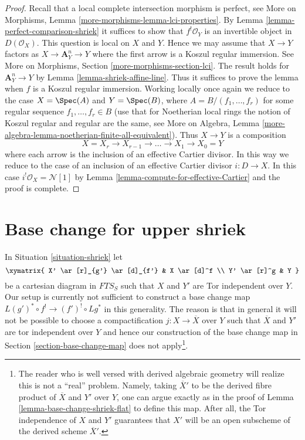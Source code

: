 \begin{proof}
Recall that a local complete intersection morphism is perfect, see
More on Morphisms, Lemma \ref{more-morphisms-lemma-lci-properties}.
By Lemma \ref{lemma-perfect-comparison-shriek} it suffices to show
that $f^!\mathcal{O}_Y$ is an invertible object in $D(\mathcal{O}_X)$.
This question is local on $X$ and $Y$. Hence we may assume that $X \to Y$
factors as $X \to \mathbf{A}^n_Y \to Y$ where the first arrow is a
Koszul regular immersion. See More on Morphisms, Section
\ref{more-morphisms-section-lci}.
The result holds for $\mathbf{A}^n_Y \to Y$
by Lemma \ref{lemma-shriek-affine-line}. Thus it suffices to prove
the lemma when $f$ is a Koszul regular immersion.
Working locally once again we reduce to the case
$X = \Spec(A)$ and $Y = \Spec(B)$, where $A = B/(f_1, \ldots, f_r)$
for some regular sequence $f_1, \ldots, f_r \in B$
(use that for Noetherian local rings the notion of Koszul
regular and regular are the same, see
More on Algebra, Lemma
\ref{more-algebra-lemma-noetherian-finite-all-equivalent}).
Thus $X \to Y$ is a composition
$$
X = X_r \to X_{r - 1} \to \ldots \to X_1 \to X_0 = Y
$$
where each arrow is the inclusion of an effective Cartier divisor.
In this way we reduce to the case of an inclusion of an effective
Cartier divisor $i : D \to X$. In this case
$i^!\mathcal{O}_X = \mathcal{N}[1]$ by
Lemma \ref{lemma-compute-for-effective-Cartier} and the proof is complete.
\end{proof}







\section{Base change for upper shriek}
\label{section-base-change-shriek}

\noindent
In Situation \ref{situation-shriek} let
$$
\xymatrix{
X' \ar[r]_{g'} \ar[d]_{f'} & X \ar[d]^f \\
Y' \ar[r]^g & Y
}
$$
be a cartesian diagram in $\textit{FTS}_S$ such that
$X$ and $Y'$ are Tor independent over $Y$. Our setup is currently
not sufficient to construct a base change map
$L(g')^* \circ f^! \to (f')^! \circ Lg^*$ in this generality.
The reason is that in general it will not be possible to choose
a compactification $j : X \to \overline{X}$ over $Y$ such that
$\overline{X}$ and $Y'$ are tor independent over $Y$ and hence
our construction of the base change map in
Section \ref{section-base-change-map} does not apply\footnote{
The reader who is well versed with derived algebraic geometry
will realize this is not a ``real'' problem. Namely, taking
$\overline{X}'$ to be the derived fibre product of
$\overline{X}$ and $Y'$ over $Y$, one can argue exactly as in
the proof of Lemma \ref{lemma-base-change-shriek-flat}
to define this map. After all, the Tor independence
of $X$ and $Y'$ guarantees that $X'$ will be an open subscheme
of the derived scheme $\overline{X}'$.}.

